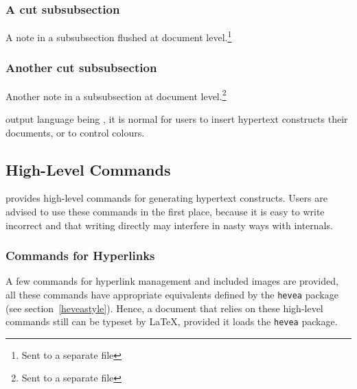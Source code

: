 \subsubsection{A cut subsubsection}
A note in a subsubsection flushed at document level.\footnote{Sent to a
separate file}
\subsubsection{Another cut subsubsection}
Another note in a subsubsection at document level.\footnote{Sent to
a separate file}
%
\cutend
\fi

\hevea{} output language being \html{}, it is normal for users to insert
hypertext constructs their documents, or to control colours.

\subsection{High-Level Commands}
\hevea{} provides high-level commands for generating
hypertext constructs.
Users are advised to use these commands in the first place,
because it is easy to write incorrect \html{} and that writing
\html{} directly may interfere in nasty ways with \hevea{} internals.


\subsubsection{Commands for Hyperlinks}\label{hyperlink}
A few commands for hyperlink  management and included images
are provided, all these
commands have appropriate equivalents defined by the \texttt{hevea}
package (see section~\ref{heveastyle}).
Hence, a document that relies on these high-level commands
still can be typeset by \LaTeX{}, provided it loads the \texttt{hevea}
package.

